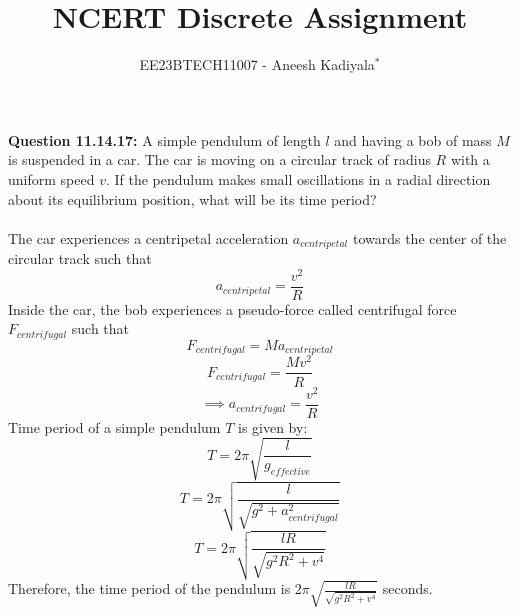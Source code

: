\documentclass[journal,12pt,twocolumn]{IEEEtran}
\theoremstyle{remark}
\begin{document}

\vspace{3cm}

\title{NCERT Discrete Assignment}
\author{EE23BTECH11007 - Aneesh Kadiyala$^{*}$%
}
\maketitle
\newpage
\bigskip

\renewcommand{\thefigure}{\theenumi}
\renewcommand{\thetable}{\theenumi}

\vspace{3cm}
\textbf{Question 11.14.17:} A simple pendulum of length $l$ and having a bob of mass $M$ is suspended in a car. The car is moving on a circular track of radius $R$ with a uniform speed $v$. If the pendulum makes small oscillations in a radial direction about its equilibrium position, what will be its time period?
\\
\solution
\\
The car experiences a centripetal acceleration $a_{centripetal}$ towards the center of the circular track such that
\[a_{centripetal} = \frac{v^2}{R}\]
Inside the car, the bob experiences a pseudo-force called centrifugal force $F_{centrifugal}$ such that
\[F_{centrifugal} = Ma_{centripetal}\]
\[F_{centrifugal} = \frac{Mv^2}{R}\]
\[\implies a_{centrifugal} = \frac{v^2}{R}\]
Time period of a simple pendulum $T$ is given by:
\[T = 2\pi\sqrt{\frac{l}{g_{effective}}}\]
\[T = 2\pi\sqrt{\frac{l}{\sqrt{g^2 + a_{centrifugal}^2}}}\]
\[T = 2\pi\sqrt{\frac{lR}{\sqrt{g^2R^2 + v^4}}}\]
Therefore, the time period of the pendulum is $2\pi\sqrt{\frac{lR}{\sqrt{g^2R^2 + v^4}}}$ seconds.
\end{document}
